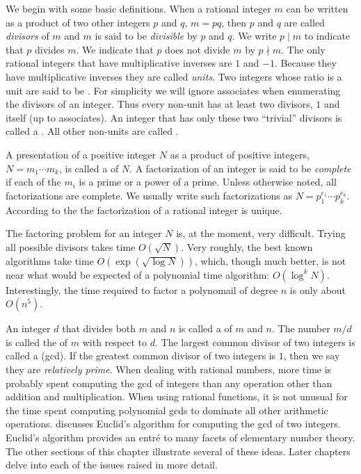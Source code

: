 \medskip
We begin with some basic definitions.  When a rational integer $m$ can
be written as a product of two other integers $p$ and $q$, $m = pq$,
then $p$ and $q$ are called {\em divisors} of $m$ and
$m$ is said to be {\em divisible} by $p$ and
$q$. We write $p \mid m$ to indicate that
$p$ divides $m$.  We indicate that $p$ does not divide $m$ by $p \nmid
m$.  The only rational integers that have multiplicative inverses are
$1$ and $-1$.  Because they have multiplicative inverses they are
called {\em units}. Two integers whose ratio is
a unit are said to be .  For simplicity we will
ignore associates when enumerating the divisors of an integer.  Thus
every non-unit has at least two divisors, $1$ and itself (up to
associates).  An integer that has only these two ``trivial''
divisors is called a .  All other
non-units are called .

A presentation of a positive integer $N$ as a product of positive
integers, $N = m_1 \cdots m_k$, is called a  of
$N$.  A factorization of an integer is said to be {\em
complete} if each of the $m_i$ is a
prime or a power of a prime.  Unless otherwise noted, all
factorizations are complete.  We usually write such factorizations as
$N= p_1^{e_1} \cdots p_k^{e_k}$.  According to the
 the factorization of a
rational integer is unique.

The factoring problem for an integer $N$ is, at the moment, very
difficult.  Trying all possible divisors takes time $O(\sqrt{N})$.
Very roughly, the best known algorithms take time $O(\exp(\sqrt{\log
N}))$, which, though much better, is not near what would be expected
of a polynomial time algorithm: $O(\log^k N)$.  Interestingly, the
time required to factor a polynomail of degree $n$ is only about $O(n^5)$.

An integer $d$ that divides both $m$ and $n$ is called a  of $m$ and $n$.  The number $m/d$ is called the
 of $m$ with respect to $d$.  The largest common
divisor of two integers is called a 
({\sc gcd}).  If the greatest common divisor of two integers is $1$,
then we say they are {\em relatively prime\/}.
When dealing with rational numbers, more time is probably spent
computing the {\sc gcd} of integers than any operation other than
addition and multiplication.  When using rational functions, it is not
unusual for the time spent computing polynomial {\sc gcd}s to dominate
all other arithmetic operations.  
discusses Euclid's algorithm for computing the {\sc gcd} of two
integers.  Euclid's algorithm provides an entr\'e to many facets of
elementary number theory.  The other sections of this chapter
illustrate several of these ideas.  Later chapters delve into each of
the issues raised in more detail.

